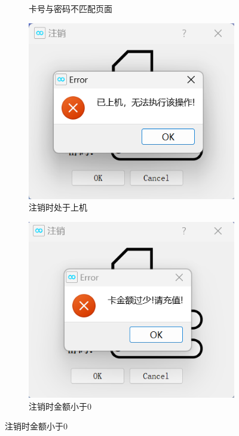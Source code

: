 \documentclass{article}
\begin{document}
\begin{figure}[htbp]
\begin{subfigure}{0.24\linewidth}
            \caption{卡号与密码不匹配页面}
            \label{annul_id_password_error}
        \end{subfigure}
        \centering
        \begin{subfigure}{0.24\linewidth}
            \centering
            \includegraphics[width=\linewidth]{figure/annul_logon_error.png}
            \caption{注销时处于上机}
            \label{annul_logon_error}
        \end{subfigure}
        \centering
        \begin{subfigure}{0.24\linewidth}
            \centering
            \includegraphics[width=\linewidth]{figure/annul_less_money.png}
            \caption{注销时金额小于0}
            \label{annul_less_money}
        \end{subfigure}
    \end{figure}
\end{document}
